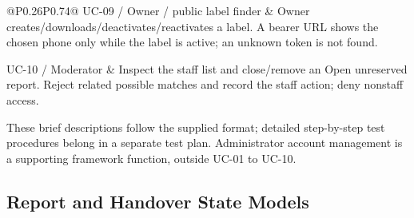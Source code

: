 \documentclass[12pt,a4paper,oneside]{report}
\begin{document}
\begin{longtable}{@{}P{0.26\dimexpr\textwidth-12pt\relax}P{0.74\dimexpr\textwidth-12pt\relax}@{}}
UC-09 / Owner / public label finder & Owner creates/downloads/deactivates/reactivates a label. A bearer URL shows the chosen phone only while the label is active; an unknown token is not found. \\ \addlinespace[3pt]

UC-10 / Moderator & Inspect the staff list and close/remove an Open unreserved report. Reject related possible matches and record the staff action; deny nonstaff access. \\ \addlinespace[3pt]

\end{longtable}

These brief descriptions follow the supplied format; detailed step-by-step test procedures belong in a separate test plan. Administrator account management is a supporting framework function, outside UC-01 to UC-10.


\subsection{Report and Handover State Models}
\end{document}
